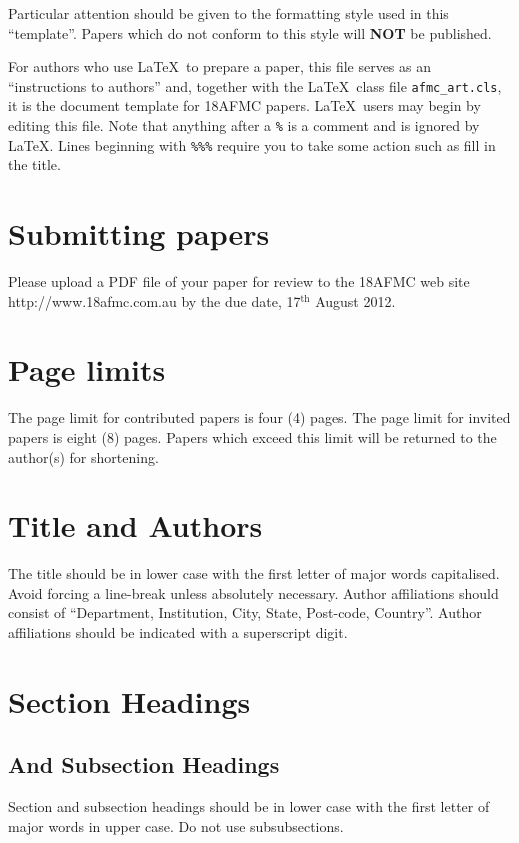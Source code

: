 \documentclass[twocolumn]{afmc_art}
\begin{document}
Particular attention should be given to the 
formatting style used in this ``template''. 
Papers which do not conform to this style will
{\bf NOT} be published. 

For authors who use \LaTeX\ to prepare a paper,
this file serves as an ``instructions to authors'' and,
together with the \LaTeX\ class file \texttt{afmc\_art.cls},
it is the document template for 18AFMC papers.
\LaTeX\ users may begin by editing this file.
Note that anything after a \texttt{\%} is a comment and
is ignored by \LaTeX.
Lines beginning with \texttt{\%\%\%} require you to take some
action such as fill in the title.

\section{Submitting papers}

Please upload a PDF file of your paper for review to the 18AFMC web site
http://www.18afmc.com.au
by the due date, 17$^{\mbox{th}}$ August 2012.

\section{Page limits}
The page limit for contributed papers is four (4) pages. The page limit for 
invited papers is eight (8) pages. Papers which exceed this limit will be 
returned to the author(s) for shortening. 

\section{Title and Authors}
The title should be in lower case with the first letter of major words
capitalised. Avoid forcing a line-break unless absolutely necessary.
Author affiliations should consist of ``Department, Institution, City,
State, Post-code, Country''. Author affiliations should be indicated
with a superscript digit. 

\section{Section Headings}

\subsection{And Subsection Headings}

Section and subsection headings should be in lower case with the first 
letter of major words in upper case. Do not use subsubsections.
\end{document}
